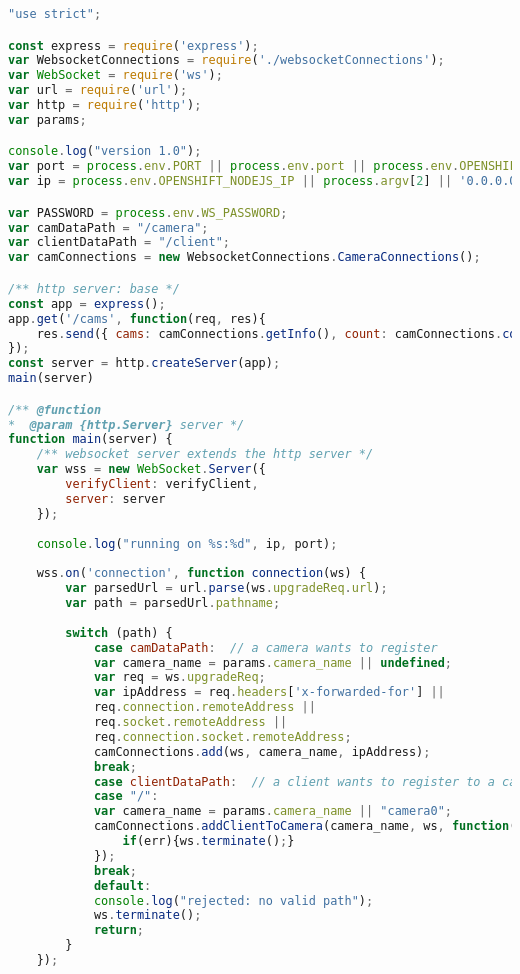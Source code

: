 \documentclass[hidelinks,11pt,a4paper,oneside,article]{memoir}
\begin{document}
\begin{lstlisting}[label={listing:nodejsmain},caption={Main file},language=JavaScript, style=styleprogrammingappendix]
"use strict";

const express = require('express');
var WebsocketConnections = require('./websocketConnections');
var WebSocket = require('ws');
var url = require('url');
var http = require('http');
var params;

console.log("version 1.0");
var port = process.env.PORT || process.env.port || process.env.OPENSHIFT_NODEJS_PORT || 8080;
var ip = process.env.OPENSHIFT_NODEJS_IP || process.argv[2] || '0.0.0.0';

var PASSWORD = process.env.WS_PASSWORD;
var camDataPath = "/camera";
var clientDataPath = "/client";
var camConnections = new WebsocketConnections.CameraConnections();

/** http server: base */
const app = express();
app.get('/cams', function(req, res){
    res.send({ cams: camConnections.getInfo(), count: camConnections.count()});
});
const server = http.createServer(app);
main(server)

/** @function
*  @param {http.Server} server */
function main(server) {
    /** websocket server extends the http server */
    var wss = new WebSocket.Server({
        verifyClient: verifyClient,
        server: server
    });
    
    console.log("running on %s:%d", ip, port);
    
    wss.on('connection', function connection(ws) {
        var parsedUrl = url.parse(ws.upgradeReq.url);
        var path = parsedUrl.pathname;
        
        switch (path) {
            case camDataPath:  // a camera wants to register
            var camera_name = params.camera_name || undefined;
            var req = ws.upgradeReq;
            var ipAddress = req.headers['x-forwarded-for'] || 
            req.connection.remoteAddress || 
            req.socket.remoteAddress ||
            req.connection.socket.remoteAddress;
            camConnections.add(ws, camera_name, ipAddress);
            break;
            case clientDataPath:  // a client wants to register to a camera
            case "/":
            var camera_name = params.camera_name || "camera0";
            camConnections.addClientToCamera(camera_name, ws, function(err){
                if(err){ws.terminate();}
            });
            break;
            default:
            console.log("rejected: no valid path");
            ws.terminate();
            return;
        }
    });
    

\end{lstlisting}
\end{document}
